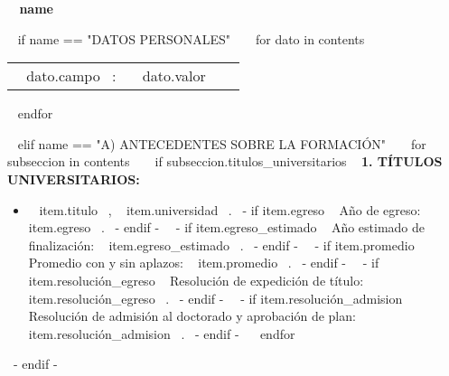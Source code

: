 \providecommand{\espacioEntreSecciones}{\vspace{3mm}}
\providecommand{\espacioEntreSubSecciones}{\vspace{2mm}}
\providecommand{\espacioEntreItems}{\vspace{1.1mm}}

\medskip

\selectfont

\hspace{-20mm}\colorbox{maincolor}{\begin{minipage}[t][8mm][c]{192mm}
\hspace{8mm}\bfseries \color{white}  ~{{ name }}~
\end{minipage}}
\vspace{6mm}


~{ if name == "DATOS PERSONALES" }~
  ~{ for dato in contents }~
    \begin{tabular}{ @{} p{38mm} p{90mm} l @{}}
      {\small ~{{ dato.campo }}~}: & {\small ~{{ dato.valor }}~}
    \end{tabular}
    \espacioEntreItems{}
  ~{ endfor }~
  \espacioEntreSecciones{}

~{ elif name == "A) ANTECEDENTES SOBRE LA FORMACIÓN" }~
  ~{ for subseccion in contents }~
    ~{ if subseccion.titulos_universitarios }~
      \textbf{1. TÍTULOS UNIVERSITARIOS:}
      \begin{itemize}
      ~{ for item in subseccion.titulos_universitarios }~
        \item ~{{ item.titulo }}~, ~{{ item.universidad }}~.
              ~{- if item.egreso }~ Año de egreso: ~{{ item.egreso }}~. ~{- endif -}~
              ~{- if item.egreso_estimado }~ Año estimado de finalización: ~{{ item.egreso_estimado }}~. ~{- endif -}~
              ~{- if item.promedio }~ Promedio con y sin aplazos: ~{{ item.promedio }}~. ~{- endif -}~
              ~{- if item.resolución_egreso }~ Resolución de expedición de título: ~{{ item.resolución_egreso }}~. ~{- endif -}~
              ~{- if item.resolución_admision }~ Resolución de admisión al doctorado y aprobación de plan: ~{{ item.resolución_admision }}~. ~{- endif -}~
        \espacioEntreItems{}
      ~{ endfor }~
      \end{itemize}
      \espacioEntreSubSecciones{}
    ~{- endif -}~

